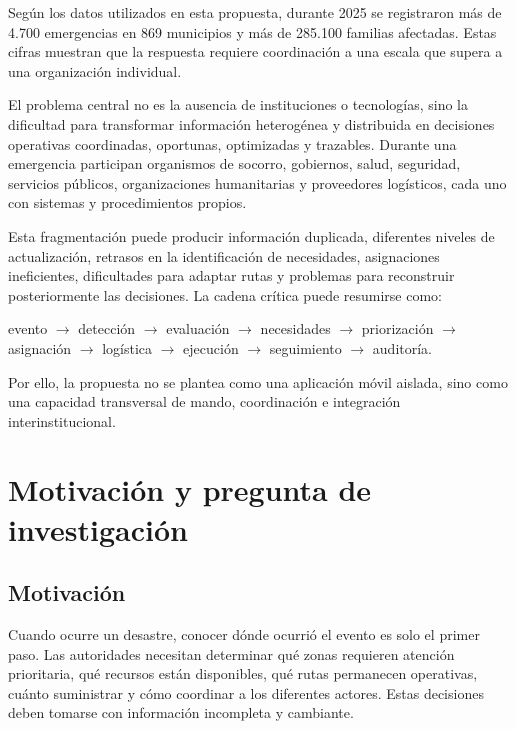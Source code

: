 \documentclass[11pt,a4paper]{article}
\begin{document}
Según los datos utilizados en esta propuesta, durante 2025 se registraron más
de 4.700 emergencias en 869 municipios y más de 285.100 familias afectadas.
Estas cifras muestran que la respuesta requiere coordinación a una escala que
supera a una organización individual.

El problema central no es la ausencia de instituciones o tecnologías, sino la
dificultad para transformar información heterogénea y distribuida en
decisiones operativas coordinadas, oportunas, optimizadas y trazables. Durante
una emergencia participan organismos de socorro, gobiernos, salud, seguridad,
servicios públicos, organizaciones humanitarias y proveedores logísticos, cada
uno con sistemas y procedimientos propios.

Esta fragmentación puede producir información duplicada, diferentes niveles de
actualización, retrasos en la identificación de necesidades, asignaciones
ineficientes, dificultades para adaptar rutas y problemas para reconstruir
posteriormente las decisiones. La cadena crítica puede resumirse como:

\begin{center}
evento $\rightarrow$ detección $\rightarrow$ evaluación $\rightarrow$
necesidades $\rightarrow$ priorización $\rightarrow$ asignación $\rightarrow$
logística $\rightarrow$ ejecución $\rightarrow$ seguimiento $\rightarrow$
auditoría.
\end{center}

Por ello, la propuesta no se plantea como una aplicación móvil aislada, sino
como una capacidad transversal de mando, coordinación e integración
interinstitucional.

\section{Motivación y pregunta de investigación}

\subsection{Motivación}

Cuando ocurre un desastre, conocer dónde ocurrió el evento es solo el primer
paso. Las autoridades necesitan determinar qué zonas requieren atención
prioritaria, qué recursos están disponibles, qué rutas permanecen operativas,
cuánto suministrar y cómo coordinar a los diferentes actores. Estas decisiones
deben tomarse con información incompleta y cambiante.
\end{document}
